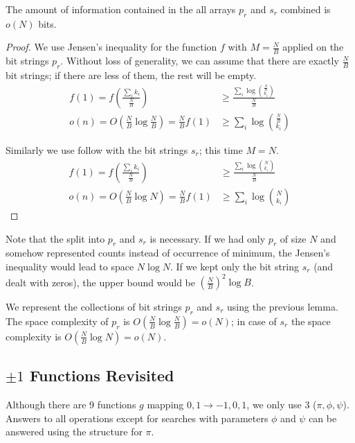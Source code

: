\begin{lemma}
	The amount of information contained in the all arrays $p_r$ and $s_r$ combined is $o(N)$ bits.
\end{lemma}
\begin{proof}
	We use Jensen's inequality for the function $f$ with $M = \frac{N}{B}$ applied on the bit strings $p_r$.
	Without loss of generality, we can assume that there are exactly $\frac{N}{B}$ bit strings; if there are less of them, the rest will be empty.
	\begin{align*}
		f(1) = f\left(\frac{\sum_i k_i}{\frac{N}{B}}\right) &\ge \frac{\sum_i \log {\frac{N}{B} \choose k_i}}{\frac{N}{B}} \\
		o(n) = O\left(\frac{N}{B} \log \frac{N}{B}\right) = \frac{N}{B} f(1) &\ge \sum_i \log {\frac{N}{B} \choose k_i}
	\end{align*}
	
	Similarly we use follow with the bit strings $s_r$; this time $M = N$.
	\begin{align*}
		f(1) = f\left(\frac{\sum_i k_i}{\frac{N}{B}}\right) &\ge \frac{\sum_i \log {N \choose k_i}}{\frac{N}{B}} \\
		o(n) = O\left(\frac{N}{B} \log N\right) = \frac{N}{B} f(1) &\ge \sum_i \log {N \choose k_i}
	\end{align*}
\end{proof}

Note that the split into $p_r$ and $s_r$ is necessary.
If we had only $p_r$ of size $N$ and somehow represented counts instead of occurrence of minimum, the Jensen's inequality would lead to space $N \log N$.
If we kept only the bit string $s_r$ (and dealt with zeros), the upper bound would be $\left(\frac{N}{B}\right)^2 \log B$.

\fi

We represent the collections of bit strings $p_r$ and $s_r$ using the previous lemma. 
The space complexity of $p_r$ is $O\left(\frac{N}{B} \log \frac{N}{B}\right) = o(N)$; in case of $s_r$ the space complexity is $O\left(\frac{N}{B} \log N \right) = o(N)$.

\subsection{$\pm 1$ Functions Revisited}

Although there are 9 functions $g$ mapping ${0, 1} \to {-1, 0, 1}$, we only use 3 ($\pi, \phi, \psi$).
Answers to all operations except for searches with parameters $\phi$ and $\psi$ can be answered using the structure for $\pi$.

